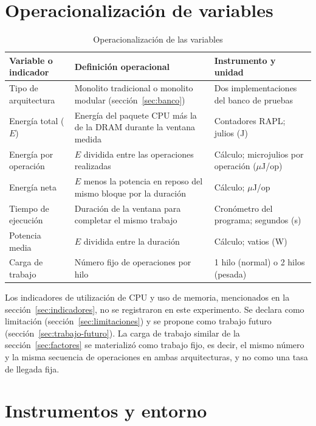 \section{Operacionalización de variables}
\label{sec:operacionalizacion}

\begin{table}[htbp]
\centering
\caption{Operacionalización de las variables}
\label{tab:operacionalizacion}
\small
{}
\setlength{\parskip}{0pt}
\begin{tabular}{@{}p{2.8cm}p{6.2cm}p{5.2cm}@{}}
\toprule
\textbf{Variable o indicador} & \textbf{Definición operacional} & \textbf{Instrumento y unidad} \\
\midrule
Tipo de arquitectura & Monolito tradicional o monolito modular (sección~\ref{sec:banco}) & Dos implementaciones del banco de pruebas \\[3pt]
Energía total ($E$) & Energía del paquete CPU más la de la DRAM durante la ventana medida & Contadores RAPL; julios (J) \\[3pt]
Energía por operación & $E$ dividida entre las operaciones realizadas & Cálculo; microjulios por operación ($\mu$J/op) \\[3pt]
Energía neta & $E$ menos la potencia en reposo del mismo bloque por la duración & Cálculo; $\mu$J/op \\[3pt]
Tiempo de ejecución & Duración de la ventana para completar el mismo trabajo & Cronómetro del programa; segundos (s) \\[3pt]
Potencia media & $E$ dividida entre la duración & Cálculo; vatios (W) \\[3pt]
Carga de trabajo & Número fijo de operaciones por hilo & 1 hilo (normal) o 2 hilos (pesada) \\
\bottomrule
\end{tabular}
\end{table}

Los indicadores de utilización de CPU y uso de memoria, mencionados en la sección~\ref{sec:indicadores}, no se registraron en este experimento. Se declara como limitación (sección~\ref{sec:limitaciones}) y se propone como trabajo futuro (sección~\ref{sec:trabajo-futuro}). La carga de trabajo similar de la sección~\ref{sec:factores} se materializó como trabajo fijo, es decir, el mismo número y la misma secuencia de operaciones en ambas arquitecturas, y no como una tasa de llegada fija.

\section{Instrumentos y entorno}
\label{sec:instrumentos}

